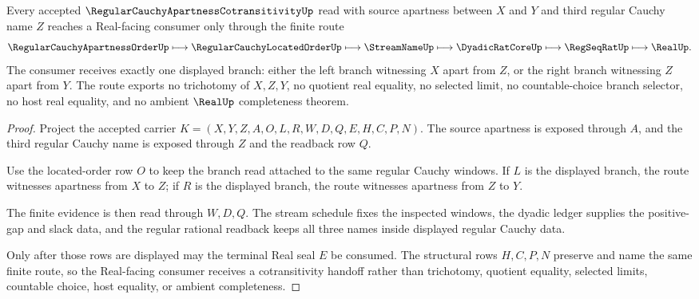 \begin{theorem}
\label{thm:regular-cauchy-apartness-cotransitivity-route}
Every accepted $\RegularCauchyApartnessCotransitivityUp$ read with source apartness between $X$ and $Y$ and third regular Cauchy name $Z$ reaches a Real-facing consumer only through the finite route
$$
\RegularCauchyApartnessOrderUp \longmapsto \RegularCauchyLocatedOrderUp \longmapsto \StreamNameUp \longmapsto \DyadicRatCoreUp \longmapsto \RegSeqRatUp \longmapsto \RealUp .
$$
The consumer receives exactly one displayed branch: either the left branch witnessing $X$ apart from $Z$, or the right branch witnessing $Z$ apart from $Y$. The route exports no trichotomy of $X,Z,Y$, no quotient real equality, no selected limit, no countable-choice branch selector, no host real equality, and no ambient $\RealUp$ completeness theorem.
\end{theorem}
\begin{proof}
Project the accepted carrier $K=(X,Y,Z,A,O,L,R,W,D,Q,E,H,C,P,N)$. The source apartness is exposed through $A$, and the third regular Cauchy name is exposed through $Z$ and the readback row $Q$.

Use the located-order row $O$ to keep the branch read attached to the same regular Cauchy windows. If $L$ is the displayed branch, the route witnesses apartness from $X$ to $Z$; if $R$ is the displayed branch, the route witnesses apartness from $Z$ to $Y$.

The finite evidence is then read through $W,D,Q$. The stream schedule fixes the inspected windows, the dyadic ledger supplies the positive-gap and slack data, and the regular rational readback keeps all three names inside displayed regular Cauchy data.

Only after those rows are displayed may the terminal Real seal $E$ be consumed. The structural rows $H,C,P,N$ preserve and name the same finite route, so the Real-facing consumer receives a cotransitivity handoff rather than trichotomy, quotient equality, selected limits, countable choice, host equality, or ambient completeness.
\end{proof}


